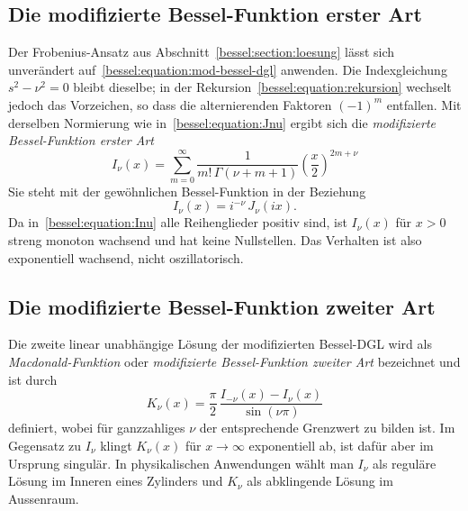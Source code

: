 \subsection{Die modifizierte Bessel-Funktion erster Art
\label{bessel:subsection:Inu}}

Der Frobenius-Ansatz aus Abschnitt~\ref{bessel:section:loesung} lässt sich unverändert auf~\eqref{bessel:equation:mod-bessel-dgl} anwenden.
Die Indexgleichung $s^2 - \nu^2 = 0$ bleibt dieselbe; in der Rekursion~\eqref{bessel:equation:rekursion} wechselt jedoch das Vorzeichen, so dass die alternierenden Faktoren $(-1)^m$ entfallen.
Mit derselben Normierung wie in~\eqref{bessel:equation:Jnu} ergibt sich die \emph{modifizierte Bessel-Funktion erster Art}
\begin{equation}
\boxed{\;
I_\nu(x)
=
\sum_{m=0}^{\infty}
\frac{1}{m!\, \Gamma(\nu+m+1)}
\left(\frac{x}{2}\right)^{2m+\nu}
\;}
\label{bessel:equation:Inu}
\end{equation}
Sie steht mit der gewöhnlichen Bessel-Funktion in der Beziehung
\begin{equation}
I_\nu(x) = i^{-\nu}\, J_\nu(ix).
\label{bessel:equation:Inu-Jnu}
\end{equation}
Da in~\eqref{bessel:equation:Inu} alle Reihenglieder positiv sind, ist $I_\nu(x)$ für $x > 0$ streng monoton wachsend und hat keine Nullstellen.
Das Verhalten ist also exponentiell wachsend, nicht oszillatorisch.

\subsection{Die modifizierte Bessel-Funktion zweiter Art
\label{bessel:subsection:Knu}}

Die zweite linear unabhängige Lösung der modifizierten Bessel-DGL wird als \emph{Macdonald-Funktion} oder \emph{modifizierte Bessel-Funktion zweiter Art} bezeichnet und ist durch
\begin{equation}
K_\nu(x)
=
\frac{\pi}{2}\,
\frac{I_{-\nu}(x) - I_\nu(x)}{\sin(\nu\pi)}
\label{bessel:equation:Knu}
\end{equation}
definiert, wobei für ganzzahliges $\nu$ der entsprechende Grenzwert zu bilden ist.
Im Gegensatz zu $I_\nu$ klingt $K_\nu(x)$ für $x \to \infty$ exponentiell ab, ist dafür aber im Ursprung singulär.
In physikalischen Anwendungen wählt man $I_\nu$ als reguläre Lösung im Inneren eines Zylinders und $K_\nu$ als abklingende Lösung im Aussenraum.

